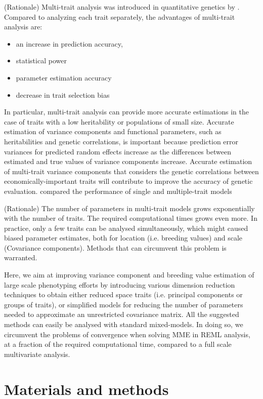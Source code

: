 \documentclass[9pt,twocolumn,twoside,lineno]{gsag3jnl}
\begin{document}
(Rationale) Multi-trait analysis was introduced in quantitative genetics by \cite{Henderson1976}. Compared to analyzing each trait separately, the advantages of multi-trait analysis are:
\begin{itemize}
    \item an increase in prediction accuracy, 
    \item statistical power 
    \item parameter estimation accuracy
    \item decrease in trait selection bias 
\end{itemize}
In particular, multi-trait analysis can provide more accurate estimations in the case of traits with a low heritability or populations of small size. Accurate estimation of variance components and functional parameters, such as heritabilities and genetic correlations, is important because prediction error variances for predicted random effects increase as the differences between estimated and true values of variance components increase. Accurate estimation of multi-trait variance components that considers the genetic correlations between economically-important traits will contribute to improve the accuracy of genetic evaluation. \cite{Guo2014} compared the performance of single and multiple-trait models

(Rationale) The number of parameters in multi-trait models grows exponentially with the number of traits. The required computational times grows even more. In practice, only a few traits can be analysed simultaneously, which might caused biased parameter estimates, both for location (i.e. breeding values) and scale (Covariance components). Methods that can circumvent this problem is warranted.   


Here, we aim at improving variance component and breeding value estimation of large scale phenotyping efforts by introducing various dimension reduction techniques to obtain either reduced space traits (i.e. principal components or groups of traits), or simplified models for reducing the number of parameters needed to approximate an unrestricted covariance matrix. All the suggested methods can easily be analysed with standard mixed-models. In doing so, we circumvent the problems of convergence when solving MME in REML analysis, at a fraction of the required computational time, compared to a full scale multivariate analysis. 


\section{Materials and methods}
\label{sec:materials:methods}
\end{document}
